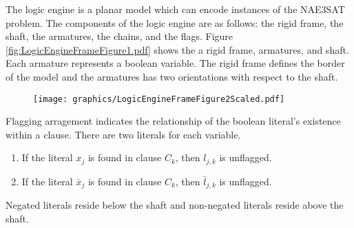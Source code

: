The logic engine is a planar model which can encode instances of the NAE3SAT problem.  The 
components of the logic engine are as follows: the rigid frame, the shaft, the armatures,
the chains, and the flags.  Figure \ref{fig:LogicEngineFrameFigure1.pdf} shows the a rigid frame, 
armatures, and shaft.  Each armature represents a boolean variable.  The rigid frame defines the border 
of the model and the armatures has two orientations with respect to the shaft.  
\begin{figure}[!h]
\begin{center}
\texttt{[image: graphics/LogicEngineFrameFigure2Scaled.pdf]}
\caption{}\label{fig:LogicEngineFrameFigure2.pdf}
\end{center}
\end{figure}
Flagging arragement indicates the relationship of the boolean literal's existence within a clause.  
There are two literals for each variable.  
\begin{enumerate}
 \item If the literal $x_j$ is found in clause $C_k$, then $l_{j,k}$ is unflagged.
 \item If the literal $\bar{x}_j$ is found in clause $C_k$, then $\bar{l}_{j,k}$ is unflagged.
\end{enumerate}
Negated literals reside below the shaft and non-negated literals reside above the shaft.

